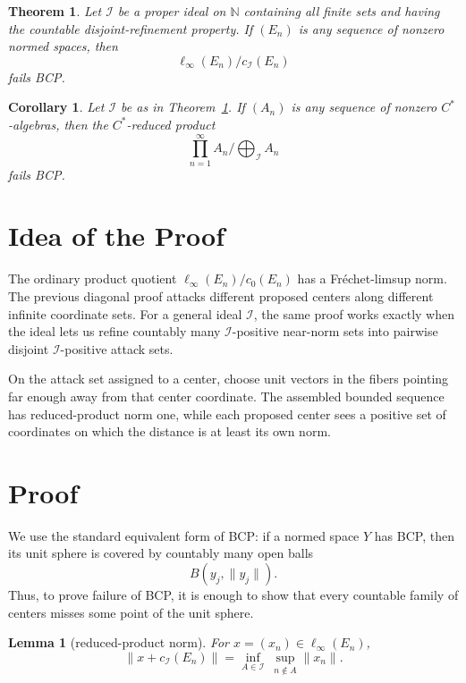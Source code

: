 \documentclass[11pt]{article}
\newtheorem{theorem}{Theorem}
\newtheorem{lemma}{Lemma}
\newtheorem{corollary}{Corollary}
\newcommand{\N}{\mathbb N}
\newcommand{\cI}{\mathcal I}
\begin{document}
\begin{theorem}
\label{thm:ideal-reduced-products}
Let \(\cI\) be a proper ideal on \(\N\) containing all finite sets and having
the countable disjoint-refinement property.  If \((E_n)\) is any sequence of
nonzero normed spaces, then
\[
        \ell_\infty(E_n)/c_\cI(E_n)
\]
fails BCP.
\end{theorem}

\begin{corollary}
\label{cor:cstar-reduced-products}
Let \(\cI\) be as in Theorem~\ref{thm:ideal-reduced-products}.  If
\((A_n)\) is any sequence of nonzero \(C^*\)-algebras, then the
\(C^*\)-reduced product
\[
        \prod_{n=1}^\infty A_n \Big/ \bigoplus\nolimits_{\cI} A_n
\]
fails BCP.
\end{corollary}

\section*{Idea of the Proof}

The ordinary product quotient \(\ell_\infty(E_n)/c_0(E_n)\) has a
Fréchet-limsup norm.  The previous diagonal proof attacks different proposed
centers along different infinite coordinate sets.  For a general ideal
\(\cI\), the same proof works exactly when the ideal lets us refine countably
many \(\cI\)-positive near-norm sets into pairwise disjoint \(\cI\)-positive
attack sets.

On the attack set assigned to a center, choose unit vectors in the fibers
pointing far enough away from that center coordinate.  The assembled bounded
sequence has reduced-product norm one, while each proposed center sees a
positive set of coordinates on which the distance is at least its own norm.

\section*{Proof}

We use the standard equivalent form of BCP: if a normed space \(Y\) has BCP,
then its unit sphere is covered by countably many open balls
\[
        B(y_j,\|y_j\|).
\]
Thus, to prove failure of BCP, it is enough to show that every countable family
of centers misses some point of the unit sphere.

\begin{lemma}[reduced-product norm]
\label{lem:reduced-norm}
For \(x=(x_n)\in\ell_\infty(E_n)\),
\[
        \|x+c_\cI(E_n)\|
        =
        \inf_{A\in\cI}\ \sup_{n\notin A}\|x_n\|.
\]
\end{lemma}
\end{document}
